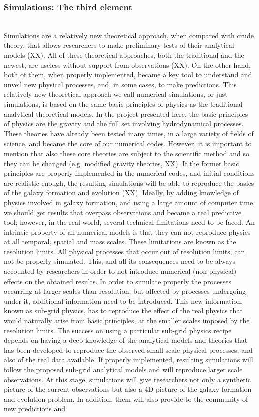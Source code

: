 \documentclass[oneside, a4paper, onecolumn, 11pt]{article}
\begin{document}
\subsubsection*{Simulations: The third element}\\
Simulations are a relatively new theoretical approach, when compared with crude theory, that allows researchers to make preliminary tests of their analytical models (XX). All of these theoretical approaches, both the traditional and the newest, are useless without support from observations (XX). On the other hand, both of them, when properly implemented, became a key tool to understand and unveil new physical processes, and, in some cases, to make predictions.
This relatively new theoretical approach we call numerical simulations, or just simulations, is based on the same basic principles of physics as the traditional analytical theoretical models. In the project presented here, the basic principles of physics are the gravity and the full set involving hydrodynamical processes. These theories have already been tested many times, in a large variety of fields of science, and became the core of our numerical codes. However, it is important to mention that also these core theories are subject to the scientific method and so they can be changed (e.g. modified gravity theories, XX). If the former basic principles are properly implemented in the numerical codes, and initial conditions are realistic enough, the resulting simulations will be able to reproduce the basics of the galaxy formation and evolution (XX). Ideally, by adding knowledge of physics involved in galaxy formation, and using a large amount of computer time, we should get results that overpass observations and became a real predictive tool; however, in the real world, several technical limitations need to be faced. An intrinsic property of all numerical models is that they can not reproduce physics at all temporal, spatial and mass scales. These limitations are known as the resolution limits. All physical processes that occur out of resolution limits, can not be properly simulated. This, and all its consequences need to be always accounted by researchers in order to not introduce numerical (non physical) effects on the obtained results. In order to simulate properly the processes occurring at larger scales than resolution, but affected by processes undergoing under it, additional information need to be introduced. This new information, known as sub-grid physics, has to reproduce the effect of the real physics that would naturally arise from basic principles, at the smaller scales imposed by the resolution limits. The success on using a particular sub-grid physics recipe depends on having a deep knowledge of the analytical models and theories that has been developed to reproduce the observed small scale physical processes, and also of the real data available. If properly implemented, resulting simulations will follow the proposed sub-grid analytical models and will reproduce larger scale observations. At this stage, simulations will give researchers not only a synthetic picture of the current observations but also a 4D picture of the galaxy formation and evolution problem. In addition, them will also provide to the community of new predictions and 
\end{document}

